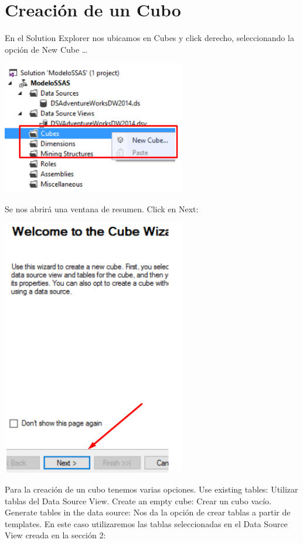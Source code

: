 \section{Creación de un Cubo}  

En el Solution Explorer nos ubicamos en Cubes y click derecho, seleccionando la opción de New Cube …
	\begin{center}
	\includegraphics[width=8cm]{images/task3/img15}
	\end{center}	
Se nos abrirá una ventana de resumen. Click en Next:
	\begin{center}
	\includegraphics[width=8cm]{images/task3/img16}
	\end{center}	
Para la creación de un cubo tenemos varias opciones.
Use existing tables: Utilizar tablas del Data Source View.
Create an empty cube: Crear un cubo vacío.
Generate tables in the data source: Nos da la opción de crear tablas a partir de templates.
En este caso utilizaremos las tablas seleccionadas en el Data Source View creada en la sección 2:
